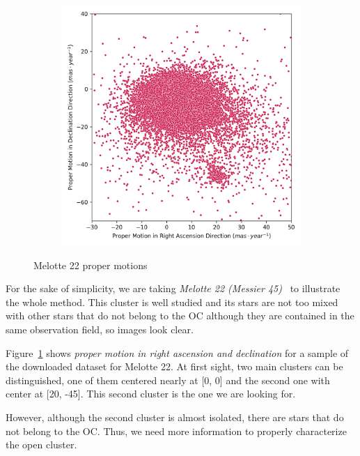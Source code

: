\documentclass[11pt, a4paper, english]{book}
\begin{document}
\begin{figure}[htbp]
  \centering
  \begin{subfigure}{0.5\textwidth}
    \centering
    \includegraphics[width=\textwidth]{../figures/melotte_22/raw_pm_melotte_22.png}
  \end{subfigure}
  \caption{Melotte 22 proper motions}
  \label{fig:raw_pm_melotte_22}
\end{figure}

For the sake of simplicity, we are taking \emph{Melotte 22 (Messier 45)}~\cite{elsanhoury2019ppmxl} to illustrate the whole method.
This cluster is well studied and its stars are not too mixed with other stars that do not belong to the OC
although they are contained in the same observation field, so images look clear.

Figure~\ref{fig:raw_pm_melotte_22} shows \emph{proper motion in right ascension and declination}
for a sample of the downloaded dataset for Melotte 22.
At first sight, two main clusters can be distinguished, one of them centered nearly at [0, 0]
and the second one with center at [20, -45]. This second cluster is the one we are looking for.

However, although the second cluster is almost isolated, there are stars that do not belong to the OC.
Thus, we need more information to properly characterize the open cluster.
\end{document}
